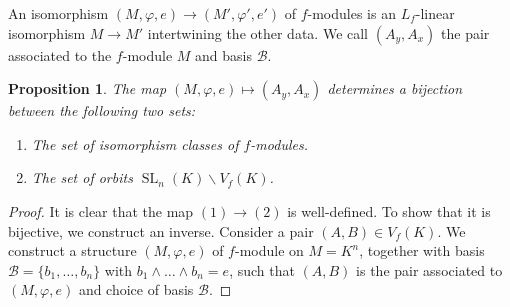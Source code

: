 \documentclass{article} %
\newtheorem{proposition}{Proposition}[section]
\numberwithin{equation}{section}
\DeclareMathOperator{\SL}{SL}
\begin{document}
An isomorphism $(M, \varphi, e) \to (M', \varphi', e')$ of $f$-modules is an $L_f$-linear isomorphism $M \to M'$ intertwining the other data. We call $(A_y, A_x)$ the pair associated to the $f$-module $M$ and basis $\mathcal{B}$. 
\begin{proposition}\label{prop_bijectionorbitsfmodules}
    The map $(M, \varphi, e) \mapsto (A_y, A_x)$ determines a bijection between the following two sets:
    \begin{enumerate}
        \item The set of isomorphism classes of $f$-modules.
        \item The set of orbits $\SL_n(K) \backslash V_f(K)$.
    \end{enumerate}
\end{proposition}
\begin{proof}
    It is clear that the map $(1) \to (2)$ is well-defined. To show that it is bijective, we construct an inverse. Consider a pair $(A, B) \in V_f(K)$. We construct a structure $(M, \varphi, e)$ of $f$-module on $M = K^n$, together with basis $\mathcal{B} = \{ b_1, \dots, b_n \}$ with $b_1 \wedge \dots \wedge b_n = e$, such that $(A, B)$ is the pair associated to $(M, \varphi, e)$ and choice of basis $\mathcal{B}$. 


\end{proof}
\end{document}
